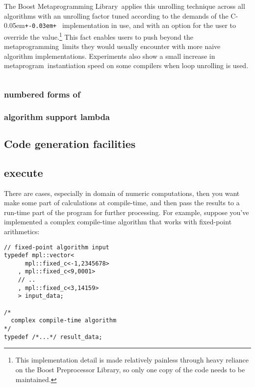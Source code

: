 \documentclass{kapproc}
\newcommand{\Cpp}{C\kern-0.05em\texttt{+\kern-0.03em+}%
}
\newcommand{\Mpl}{Boost Meta\-pro\-gram\-ming Library}
\newcommand{\mping}{meta\-pro\-gram\-ming}
\newcommand{\mpgm}{meta\-pro\-gram}
\begin{document}
The \Mpl\ applies this unrolling technique across all algorithms with
an unrolling factor tuned according to the demands of the \Cpp\
implementation in use, and with an option for the user to override the
value.\footnote{This implementation detail is made relatively painless
through heavy reliance on the Boost Preprocessor Library, so only one
copy of the code needs to be maintained.} This fact enables users to
push beyond the \mping\ limits they would usually encounter with more
naive algorithm implementations. Experiments also show a small
increase in \mpgm\ instantiation speed on some compilers when loop
unrolling is used.

{\small
\begin{codesamp}\begin{verbatim}
\end{verbatim}
\end{codesamp}
}

  \subsubsection{numbered forms of }
  \subsubsection{algorithm support lambda}

\subsection{Code generation facilities}

\subsection{execute}

There are cases, especially in domain of numeric computations, then 
you want make some part of calculations at compile-time, and then 
pass the results to a run-time part of the program for further 
processing. For example, suppose you've implemented a complex 
compile-time algorithm that works with fixed-point arithmetics:

{\small
\begin{codesamp}\begin{verbatim}
// fixed-point algorithm input
typedef mpl::vector<
      mpl::fixed_c<-1,2345678>
    , mpl::fixed_c<9,0001>
    // ..
    , mpl::fixed_c<3,14159>
    > input_data;

/*
  complex compile-time algorithm 
*/
typedef /*...*/ result_data;
\end{verbatim}
\end{codesamp}
}
\end{document}
